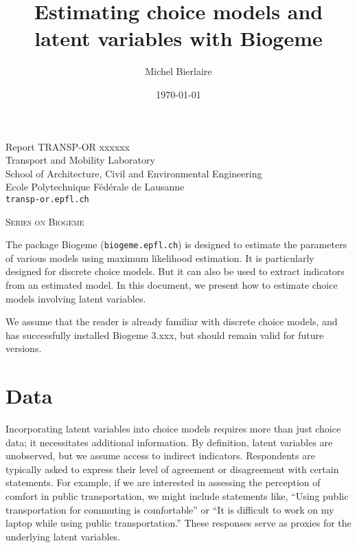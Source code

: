 \documentclass[12pt,a4paper]{article}
\title{Estimating choice models and latent variables with Biogeme}
\author{Michel Bierlaire}
\date{\today}
\begin{document}
\begin{titlepage}
\pagestyle{empty}

\maketitle
\vspace{2cm}

\begin{center}
\small Report TRANSP-OR xxxxxx  \\ Transport and Mobility Laboratory \\ School of Architecture, Civil and Environmental Engineering \\ Ecole Polytechnique F\'ed\'erale de Lausanne \\ \verb+transp-or.epfl.ch+
\begin{center}
\textsc{Series on Biogeme}
\end{center}
\end{center}


\clearpage
\end{titlepage}


The package Biogeme (\texttt{biogeme.epfl.ch}) is designed to estimate
the parameters of various models using maximum likelihood
estimation. It is particularly designed for discrete choice
models. But it can also be used to extract indicators from an
estimated model.  In this document, we present how to estimate choice
models involving latent variables.

We assume that the reader is already familiar with discrete choice
models, and has successfully installed Biogeme 3.xxx, but should remain valid for future
versions.

\section{Data}

Incorporating latent variables into choice models requires more than
just choice data; it necessitates additional information.  By
definition, latent variables are unobserved, but we assume access to
indirect indicators. Respondents are typically asked to express their
level of agreement or disagreement with certain statements. For
example, if we are interested in assessing the perception of comfort
in public transportation, we might include statements like, ``Using
public transportation for commuting is comfortable'' or ``It is
difficult to work on my laptop while using public transportation.''
These responses serve as proxies for the underlying latent variables.
\end{document}

